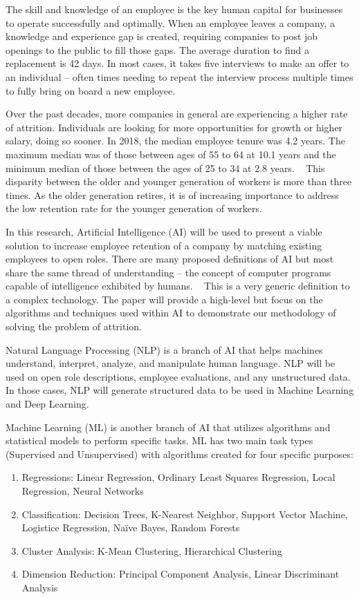 \documentclass{llncs}
\begin{document}
The skill and knowledge of an employee is the key human capital for businesses to operate successfully and optimally.  When an employee leaves a company, a knowledge and experience gap is created, requiring companies to post job openings to the public to fill those gaps.  The average duration to find a replacement is 42 days.  In most cases, it takes five interviews to make an offer to an individual – often times needing to repeat the interview process multiple times to fully bring on board a new employee.

Over the past decades, more companies in general are experiencing a higher rate of attrition.  Individuals are looking for more opportunities for growth or higher salary, doing so sooner.  In 2018, the median employee tenure was 4.2 years.  The maximum median was of those between ages of 55 to 64 at 10.1 years and the minimum median of those between the ages of 25 to 34 at 2.8 years. ~\cite{article1} This disparity between the older and younger generation of workers is more than three times.  As the older generation retires, it is of increasing importance to address the low retention rate for the younger generation of workers.

In this research, Artificial Intelligence (AI) will be used to present a viable solution to increase employee retention of a company by matching existing employees to open roles.  There are many proposed definitions of AI but most share the same thread of understanding – the concept of computer programs capable of intelligence exhibited by humans. ~\cite{book1} This is a very generic definition to a complex technology.  The paper will provide a high-level but focus on the algorithms and techniques used within AI to demonstrate our methodology of solving the problem of attrition.

Natural Language Processing (NLP) is a branch of AI that helps machines understand, interpret, analyze, and manipulate human language.  NLP will be used on open role descriptions, employee evaluations, and any unstructured data.  In those cases, NLP will generate structured data to be used in Machine Learning and Deep Learning.

Machine Learning (ML) is another branch of AI that utilizes algorithms and statistical models to perform specific tasks.  ML has two main task types (Supervised and Unsupervised) with algorithms created for four specific purposes:
    \begin{enumerate}
      \item Regressions: Linear Regression, Ordinary Least Squares Regression, Local Regression, Neural Networks
      \item Classification: Decision Trees, K-Nearest Neighbor, Support Vector Machine, Logistice Regression, Naïve Bayes, Random Forests
      \item Cluster Analysis: K-Mean Clustering, Hierarchical Clustering
      \item Dimension Reduction: Principal Component Analysis, Linear Discriminant Analysis
    \end{enumerate}
\end{document}
